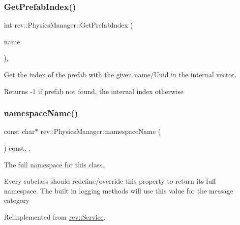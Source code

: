 \subsubsection{\texorpdfstring{GetPrefabIndex()}{GetPrefabIndex()}}
{\footnotesize\ttfamily int rev\+::\+Physics\+Manager\+::\+Get\+Prefab\+Index (\begin{DoxyParamCaption}\item[{const \mbox{\hyperlink{classrev_1_1_g_string}{G\+String}} \&}]{name }\end{DoxyParamCaption})\hspace{0.3cm}{\ttfamily [static]}, {\ttfamily [protected]}}



Get the index of the prefab with the given name/\+Uuid in the internal vector. 

\begin{DoxyReturn}{Returns}
-\/1 if prefab not found, the internal index otherwise 
\end{DoxyReturn}
\mbox{\label{classrev_1_1_physics_manager_ac541c7e0460d572c5bff2e4136c779e1}} 
\subsubsection{\texorpdfstring{namespaceName()}{namespaceName()}}
{\footnotesize\ttfamily const char$\ast$ rev\+::\+Physics\+Manager\+::namespace\+Name (\begin{DoxyParamCaption}{ }\end{DoxyParamCaption}) const\hspace{0.3cm}{\ttfamily [inline]}, {\ttfamily [override]}, {\ttfamily [virtual]}}



The full namespace for this class. 

Every subclass should redefine/override this property to return its full namespace. The built in logging methods will use this value for the message category 

Reimplemented from \mbox{\hyperlink{classrev_1_1_service_a831f5bf8c53584ec830aaee38ea58e7b}{rev\+::\+Service}}.

\mbox{\label{classrev_1_1_physics_manager_af406b7c9e1807bd55d25a2c3cc74a5ff}} 
